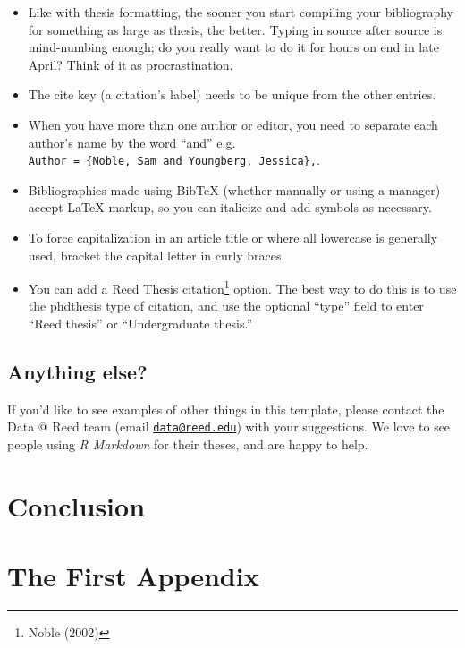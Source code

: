 \documentclass[12pt,twoside]{reedthesis}
\providecommand{\tightlist}{%
  \setlength{\itemsep}{0pt}\setlength{\parskip}{0pt}}
\theoremstyle{definition}
\theoremstyle{definition}
\theoremstyle{remark}
\begin{document}
  \begin{itemize}
  \tightlist
  \item
    Like with thesis formatting, the sooner you start compiling your
    bibliography for something as large as thesis, the better. Typing in
    source after source is mind-numbing enough; do you really want to do
    it for hours on end in late April? Think of it as procrastination.
  \item
    The cite key (a citation's label) needs to be unique from the other
    entries.
  \item
    When you have more than one author or editor, you need to separate
    each author's name by the word ``and'' e.g.
    \texttt{Author\ =\ \{Noble,\ Sam\ and\ Youngberg,\ Jessica\},}.
  \item
    Bibliographies made using BibTeX (whether manually or using a manager)
    accept LaTeX markup, so you can italicize and add symbols as
    necessary.
  \item
    To force capitalization in an article title or where all lowercase is
    generally used, bracket the capital letter in curly braces.
  \item
    You can add a Reed Thesis citation\footnote{Noble (2002)} option. The
    best way to do this is to use the phdthesis type of citation, and use
    the optional ``type'' field to enter ``Reed thesis'' or
    ``Undergraduate thesis.''
  \end{itemize}
  
  \section{Anything else?}\label{anything-else}
  
  If you'd like to see examples of other things in this template, please
  contact the Data @ Reed team (email
  \href{mailto:data@reed.edu}{\nolinkurl{data@reed.edu}}) with your
  suggestions. We love to see people using \emph{R Markdown} for their
  theses, and are happy to help.
  
  \chapter*{Conclusion}\label{conclusion}
  
  \chapter{The First Appendix}\label{the-first-appendix}
  
\end{document}
